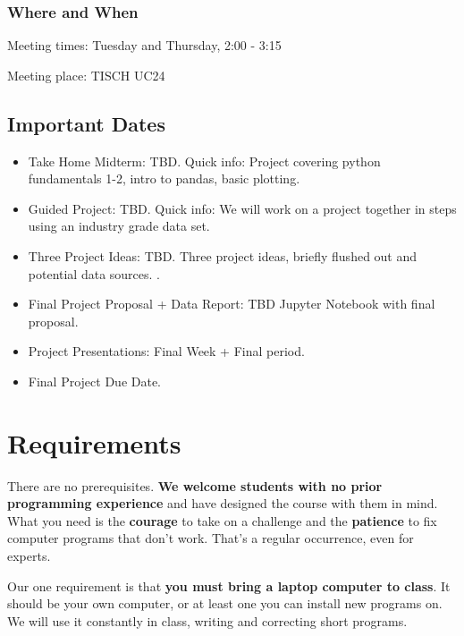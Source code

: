 \subsubsection*{Where and When}
Meeting times: Tuesday and Thursday, 2:00 - 3:15

Meeting place: TISCH UC24

\subsection*{Important Dates}

\begin{itemize}

\item Take Home Midterm: TBD. Quick info: Project covering python fundamentals 1-2, intro to pandas, basic plotting.

\item Guided Project: TBD. Quick info: We will work on a project together in steps using an industry grade data set.

\item Three Project Ideas: TBD. Three project ideas, briefly flushed out and potential data sources. .

\item Final Project Proposal + Data Report: TBD Jupyter Notebook with final proposal.

\item Project Presentations: Final Week + Final period.

\item Final Project Due Date.

\end{itemize}

\section*{Requirements}

There are no prerequisites.
{\bf We welcome students with no prior programming experience\/}
and have designed the course with them in mind.
What you need is the {\bf courage\/} to take on a challenge
and the {\bf patience\/} to fix computer programs that don't work.
That's a regular occurrence, even for experts.

Our one requirement is that {\bf you must bring a laptop computer to class\/}.
It should be your own computer, or at least one you can install new programs on.
We will use it constantly in class, writing and correcting short programs.


